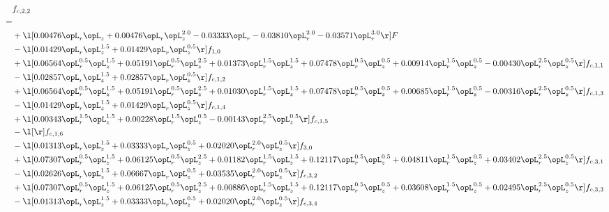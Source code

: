\begin{alignat}{2} 
\label{eq:f_22_1} 
& f_{c,2,2} \nonumber \\ 
 = \\ 
& + \l[  0.00476 \opL_r \opL_z +  0.00476 \opL_r \opL_z^{2.0}   -0.03333 \opL_r   -0.03810 \opL_r^{2.0}   -0.03571 \opL_r^{3.0}  \r] F \nonumber \\ 
& - \l[  0.01429 \opL_r \opL_z^{1.5} +  0.01429 \opL_r \opL_z^{0.5}  \r] f_{1,0} \nonumber \\ 
& + \l[  0.06564 \opL_r^{0.5} \opL_z^{1.5} +  0.05191 \opL_r^{0.5} \opL_z^{2.5} +  0.01373 \opL_r^{1.5} \opL_z^{1.5} +  0.07478 \opL_r^{0.5} \opL_z^{0.5} +  0.00914 \opL_r^{1.5} \opL_z^{0.5}   -0.00430 \opL_r^{2.5} \opL_z^{0.5}  \r] f_{c,1,1} \nonumber \\ 
& - \l[  0.02857 \opL_r \opL_z^{1.5} +  0.02857 \opL_r \opL_z^{0.5}  \r] f_{c,1,2} \nonumber \\ 
& + \l[  0.06564 \opL_r^{0.5} \opL_z^{1.5} +  0.05191 \opL_r^{0.5} \opL_z^{2.5} +  0.01030 \opL_r^{1.5} \opL_z^{1.5} +  0.07478 \opL_r^{0.5} \opL_z^{0.5} +  0.00685 \opL_r^{1.5} \opL_z^{0.5}   -0.00316 \opL_r^{2.5} \opL_z^{0.5}  \r] f_{c,1,3} \nonumber \\ 
& - \l[  0.01429 \opL_r \opL_z^{1.5} +  0.01429 \opL_r \opL_z^{0.5}  \r] f_{c,1,4} \nonumber \\ 
& + \l[  0.00343 \opL_r^{1.5} \opL_z^{1.5} +  0.00228 \opL_r^{1.5} \opL_z^{0.5}   -0.00143 \opL_r^{2.5} \opL_z^{0.5}  \r] f_{c,1,5} \nonumber \\ 
& - \l[  \r] f_{c,1,6} \nonumber \\ 
& - \l[  0.01313 \opL_r \opL_z^{1.5} +  0.03333 \opL_r \opL_z^{0.5} +  0.02020 \opL_r^{2.0} \opL_z^{0.5}  \r] f_{3,0} \nonumber \\ 
& + \l[  0.07307 \opL_r^{0.5} \opL_z^{1.5} +  0.06125 \opL_r^{0.5} \opL_z^{2.5} +  0.01182 \opL_r^{1.5} \opL_z^{1.5} +  0.12117 \opL_r^{0.5} \opL_z^{0.5} +  0.04811 \opL_r^{1.5} \opL_z^{0.5} +  0.03402 \opL_r^{2.5} \opL_z^{0.5}  \r] f_{c,3,1} \nonumber \\ 
& - \l[  0.02626 \opL_r \opL_z^{1.5} +  0.06667 \opL_r \opL_z^{0.5} +  0.03535 \opL_r^{2.0} \opL_z^{0.5}  \r] f_{c,3,2} \nonumber \\ 
& + \l[  0.07307 \opL_r^{0.5} \opL_z^{1.5} +  0.06125 \opL_r^{0.5} \opL_z^{2.5} +  0.00886 \opL_r^{1.5} \opL_z^{1.5} +  0.12117 \opL_r^{0.5} \opL_z^{0.5} +  0.03608 \opL_r^{1.5} \opL_z^{0.5} +  0.02495 \opL_r^{2.5} \opL_z^{0.5}  \r] f_{c,3,3} \nonumber \\ 
& - \l[  0.01313 \opL_r \opL_z^{1.5} +  0.03333 \opL_r \opL_z^{0.5} +  0.02020 \opL_r^{2.0} \opL_z^{0.5}  \r] f_{c,3,4} \nonumber \\ 

\end{alignat}
